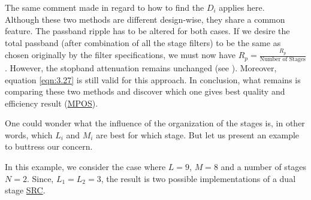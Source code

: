 \begin{itemize}
\begin{enumerate}
	 	The same comment made in regard to how to find the $D_i$ applies here.\\
	 	Although these two methods are different design-wise, they share a common feature. The passband ripple has to be altered for both cases. If we desire the total passband (after combination of all the stage filters) to be the same as chosen originally by the filter specifications, we must now have $R_p = \frac{R_p}{\text{Number of Stages}}$. However, the stopband attenuation remains unchanged (see \cite{Proakis}). Moreover, equation \ref{eqn:3.27} is still valid for this approach. 
	 	In conclusion, what remains is comparing these two methods and discover which one gives best quality and efficiency result (\hyperlink{MPOS}{MPOS}).
	 	
	 \end{enumerate}
	 
\end{itemize}

One could wonder what the influence of the organization of the stages is, in other words, which $L_i$ and $M_i$ are best for which stage. But let us present an example to buttress our concern.

In this example, we consider the case where $L=9$, $M=8$ and a number of stages $N=2$. Since, 
$L_1=L_2=3$, the result is two possible implementations of a dual stage \hyperlink{SRC}{SRC}.


